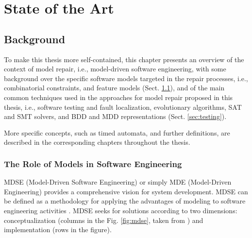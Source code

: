 \part{State of the Art}

\chapter{Background}\label{ch:background}

To make this thesis more self-contained, this chapter presents an overview of the context of model repair, i.e., model-driven software engineering, with some background over the specific software models targeted in the repair processes, i.e., combinatorial constraints, and feature models
(Sect. \ref{sec:modeldriven}), and of the main common techniques used in the approaches for model repair proposed in this thesis, i.e., software testing and fault localization, evolutionary algorithms, SAT and SMT solvers, and BDD and MDD representations (Sect. \ref{sec:testing}).

More specific concepts, such as timed automata, and further definitions, are described in the corresponding chapters throughout the thesis.

\section{The Role of Models in Software Engineering}\label{sec:modeldriven}

MDSE (Model-Driven Software Engineering) or simply MDE (Model-Driven Engineering) provides a comprehensive vision for system development. 
MDSE can be defined as a methodology for applying the advantages of modeling to software engineering activities \cite{brambillaModelDriven,hachem2016towards}.
MDSE seeks for solutions according to two dimensions: conceptualization (columns in the Fig. \ref{fig:mdse}, taken from \cite{brambillaModelDriven}) and implementation (rows in the figure).

